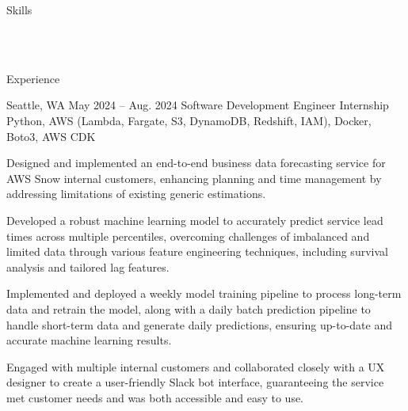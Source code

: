 \documentclass[10pt]{article}
\begin{document}
\pagestyle{empty}


\begin{customsectionnoskip}{Skills}

     \\ 
     \\ 

\end{customsectionnoskip}

\begin{customsection}{Experience}

     {Seattle, WA} {May 2024 -- Aug. 2024}
    {Software Development Engineer Internship}
    {Python, AWS (Lambda, Fargate, S3, DynamoDB, Redshift, IAM), Docker, Boto3, AWS CDK}
    {
        \item Designed and implemented an end-to-end business data forecasting service for AWS Snow internal customers, enhancing planning and time management by addressing limitations of existing generic estimations.
        \item Developed a robust machine learning model to accurately predict service lead times across multiple percentiles, overcoming challenges of imbalanced and limited data through various feature engineering techniques, including survival analysis and tailored lag features. 
        \item Implemented and deployed a weekly model training pipeline to process long-term data and retrain the model, along with a daily batch prediction pipeline to handle short-term data and generate daily predictions, ensuring up-to-date and accurate machine learning results. 
        \item Engaged with multiple internal customers and collaborated closely with a UX designer to create a user-friendly Slack bot interface, guaranteeing the service met customer needs and was both accessible and easy to use.
    }
    
\end{customsection}
\end{document}
